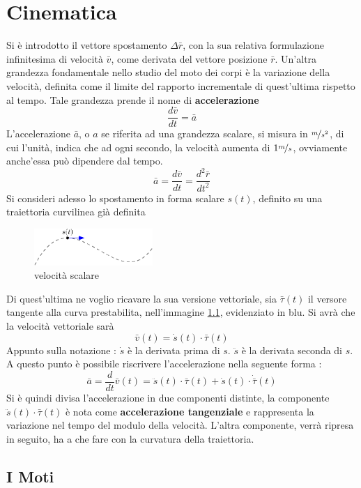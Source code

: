 \documentclass[10pt, letterpaper]{report}
\begin{document}
\chapter{Cinematica}
Si è introdotto il vettore spostamento $\Delta \bar r$, con la sua relativa formulazione infinitesima 
di velocità $\bar v$, come derivata del vettore posizione $\bar r$. 
Un'altra grandezza fondamentale nello studio del moto dei corpi è la variazione della velocità, definita 
come il limite del rapporto incrementale di quest'ultima rispetto al tempo. 
Tale grandezza prende il nome di \textbf{accelerazione}
$$ \frac{d\bar v}{d t} = \bar a $$
L'accelerazione $\bar a$, o $a$ se riferita ad una grandezza scalare, si misura in 
$\nicefrac{m}{s^2}$, di cui l'unità, indica che ad ogni secondo, la velocità aumenta 
di $1 \nicefrac{m}{s}$, ovviamente anche'essa può dipendere dal tempo. 
$$\bar a=\frac{d\bar v}{dt}=\frac{d^2\bar r}{dt^2}$$
Si consideri adesso lo spostamento in forma scalare $s(t)$, definito su una traiettoria 
curvilinea già definita
\begin{center}
    \begin{figure}[h!]
        \centering
        \includegraphics[width=0.4\textwidth]{images/accScal.eps}
        \caption{velocità scalare}
        \label{fig:velScal}
    \end{figure} 
\end{center}
Di quest'ultima ne voglio ricavare la sua versione vettoriale, sia $\bar\tau(t)$ il versore 
tangente alla curva prestabilita, nell'immagine \ref{fig:velScal}, evidenziato in blu. 
Si avrà che la velocità vettoriale sarà 
$$ \bar v(t)=\dot{s}(t)\cdot \bar\tau(t)$$
Appunto sulla notazione :  $\dot{s}$ è la derivata prima di $s$. 
$\ddot{s}$ è la derivata seconda di $s$. A questo punto è possibile riscrivere 
l'accelerazione nella seguente forma :
$$
\bar a = \dfrac{d}{dt}\bar v(t)=\ddot{s}(t)\cdot \bar\tau(t)+\dot{s}(t)\cdot\dot{\bar\tau}(t)
$$
Si è quindi divisa l'accelerazione in due componenti distinte, la componente 
$\ddot{s}(t)\cdot \bar\tau(t)$ è nota come \textbf{accelerazione tangenziale} e rappresenta 
la variazione nel tempo del modulo della velocità. L'altra componente, verrà ripresa in seguito, 
ha a che fare con la curvatura della traiettoria.\acc 
\section{I Moti}
\end{document}
